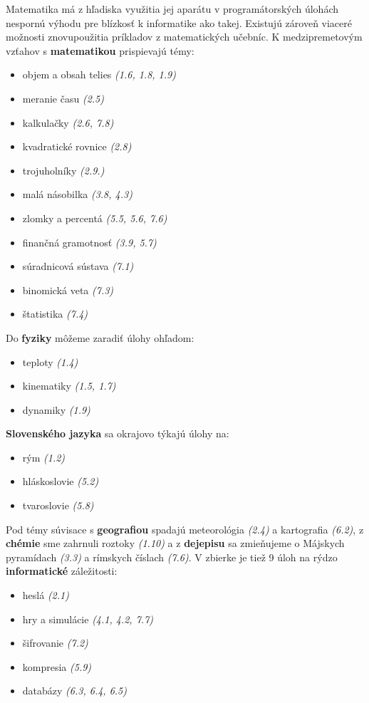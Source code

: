 Matematika má z hľadiska využitia jej aparátu v programátorských úlohách nespornú výhodu pre blízkosť k informatike ako takej. Existujú zároveň viaceré možnosti znovupoužitia príkladov z matematických učebníc. K medzipremetovým vzťahov s \textbf{matematikou} prispievajú témy:
\begin{itemize}[noitemsep,topsep=0pt]
\item objem a obsah telies \emph{(1.6, 1.8, 1.9)}
\item meranie času \emph{(2.5)}
\item kalkulačky \emph{(2.6, 7.8)}
\item kvadratické rovnice \emph{(2.8)}
\item trojuholníky \emph{(2.9.)}
\item malá násobilka \emph{(3.8, 4.3)}
\item zlomky a percentá \emph{(5.5, 5.6, 7.6)}
\item finančná gramotnosť \emph{(3.9, 5.7)}
\item súradnicová sústava \emph{(7.1)}
\item binomická veta \emph{(7.3)}
\item štatistika \emph{(7.4)}
\end{itemize}
Do \textbf{fyziky} môžeme zaradiť úlohy ohľadom: 
\begin{itemize}[noitemsep,topsep=0pt]
\item teploty \emph{(1.4)}
\item kinematiky \emph{(1.5, 1.7)}
\item dynamiky \emph{(1.9)}
\end{itemize}
\textbf{Slovenského jazyka} sa okrajovo týkajú úlohy na:
\begin{itemize}[noitemsep,topsep=0pt]
\item rým \emph{(1.2)}
\item hláskoslovie \emph{(5.2)}
\item tvaroslovie \emph{(5.8)}
\end{itemize}
Pod témy súvisace s \textbf{geografiou} spadajú meteorológia \emph{(2.4)} a kartografia \emph{(6.2)}, z \textbf{chémie} sme zahrnuli roztoky \emph{(1.10)} a z \textbf{dejepisu} sa zmieňujeme o Májskych pyramídach \emph{(3.3)} a rímskych číslach \emph{(7.6)}. 
V zbierke je tiež 9 úloh na rýdzo \textbf{informatické} záležitosti:
\begin{itemize}[noitemsep,topsep=0pt]
\item heslá \emph{(2.1)}
\item hry a simulácie \emph{(4.1, 4.2, 7.7)}
\item šifrovanie \emph{(7.2)}
\item kompresia \emph{(5.9)}
\item databázy \emph{(6.3, 6.4, 6.5)}
\end{itemize}

